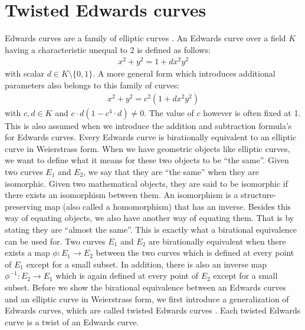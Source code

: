 \section{Twisted Edwards curves} \label{sec: Twisted Edwards curves}
Edwards curves are a family of elliptic curves \cite{edwards2007normal}.
An Edwards curve over a field $K$ having a characteristic unequal to 2 is defined as follows:
%
\begin{align*}
x^2 + y^2 = 1 + dx^2 y^2
\end{align*}
%
with scalar $d \in K \setminus \{0, 1\}$.
A more general form which introduces additional parameters also belongs to this family of curves:
%
\begin{align*}
x^2 + y^2 = c^2(1 + dx^2 y^2)
\end{align*}
%
with $c, d \in K$ and $c \cdot d (1 - c^4 \cdot d) \neq 0$.
The value of $c$ however is often fixed at 1.
This is also assumed when we introduce the addition and subtraction formula's for Edwards curves.
Every Edwards curve is birationally equivalent to an elliptic curve in Weierstrass form.
When we have geometric objects like elliptic curves, we want to define what it means for these two objects to be ``the same''.
Given two curves $E_1$ and $E_2$, we say that they are ``the same'' when they are isomorphic. Given two mathematical objects, they are said to be isomorphic if there exists an isomorphism between them. An isomorphism is a structure-preserving map (also called a homomorphism) that has an inverse.
Besides this way of equating objects, we also have another way of equating them.
That is by stating they are ``almost the same''.
This is exactly what a birational equivalence can be used for.
Two curves $E_1$ and $E_2$ are birationally equivalent when there exists a map $\phi : E_1 \to E_2$ between the two curves which is defined at every point of $E_1$ except for a small subset.
In addition, there is also an inverse map $\phi^{-1} : E_2 \to E_1$ which is again defined at every point of $E_2$ except for a small subset.
Before we show the birational equivalence between an Edwards curves and an elliptic curve in Weierstrass form, we first introduce a generalization of Edwards curves, which are called twisted Edwards curves \cite{bern2008twisted}.
Each twisted Edwards curve is a twist of an Edwards curve.
